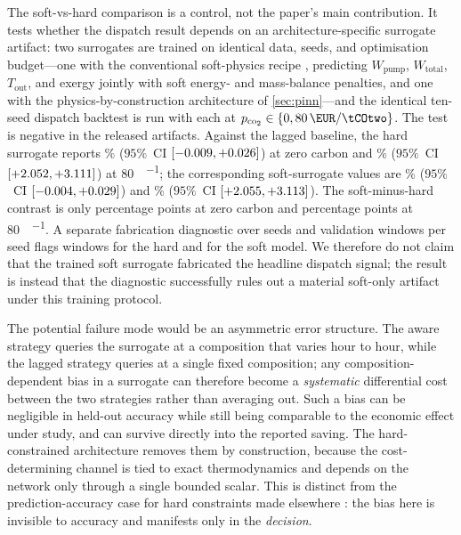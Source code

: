 \documentclass[11pt]{article}
\begin{document}
The soft-vs-hard comparison is a control, not the paper's main contribution. It
tests whether the dispatch result depends on an architecture-specific surrogate
artifact: two
surrogates are trained on identical data, seeds, and optimisation budget---one
with the conventional
soft-physics recipe \citep{raissi2019physics}, predicting $W_{\text{pump}}$,
$W_{\text{total}}$, $T_{\text{out}}$, and exergy jointly with soft energy- and
mass-balance penalties, and one with the physics-by-construction architecture of
\cref{sec:pinn}---and the identical ten-seed dispatch backtest is run with each at
$p_{\text{co}_2}\in\{0, \SI{80}{\EUR\per\tCOtwo}\}$. The test is negative in
the released artifacts. Against the lagged baseline, the hard surrogate reports
\lngSvhHardAtZeroMeanPct\% ($95\%$~CI $[-0.009,
+0.026]$) at zero carbon and
\lngSvhHardAtEightZeroMeanPct\% ($95\%$~CI
$[+2.052,
+3.111]$) at \SI{80}{\EUR\per\tCOtwo}; the
corresponding soft-surrogate values are \lngSvhSoftAtZeroMeanPct\%
($95\%$~CI $[-0.004,
+0.029]$) and \lngSvhSoftAtEightZeroMeanPct\%
($95\%$~CI $[+2.055,
+3.113]$). The soft-minus-hard contrast is only
\lngSvhContrastAtZeroPp{} percentage points at zero carbon and
\lngSvhContrastAtEightZeroPp{} percentage points at \SI{80}{\EUR\per\tCOtwo}.
A separate fabrication diagnostic over \lngFabSeedCount{} seeds and
\lngFabWindowsPerSeed{} validation windows per seed flags
\lngFabHardFlaggedWindows{} windows for the hard and
\lngFabSoftFlaggedWindows{} for the soft model. We therefore do not claim that
the trained soft surrogate fabricated the headline dispatch signal; the result
is instead that the diagnostic successfully rules out a material soft-only
artifact under this training protocol.

The potential failure mode would be an asymmetric error structure. The aware
strategy queries the surrogate at a composition that
varies hour to hour, while the lagged strategy queries at a single fixed
composition; any composition-dependent bias in a surrogate can therefore become a
\emph{systematic} differential cost between the two strategies rather than
averaging out. Such a bias can be negligible in held-out accuracy while still
being comparable to the economic effect under study, and can survive directly
into the reported saving. The hard-constrained
architecture removes them by construction, because the cost-determining channel is
tied to exact thermodynamics and depends on the network only through a single
bounded scalar. This is distinct from the prediction-accuracy case for hard
constraints made elsewhere
\citep{krishnapriyan2021characterizing,chalapathi2024moe,chen2024kkt}: the bias
here is invisible to accuracy and manifests only in the \emph{decision}.
\end{document}
